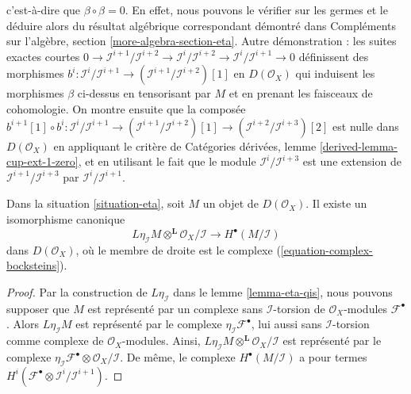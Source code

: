 {c'est-à-dire que $\beta \circ \beta = 0$. En effet, nous pouvons le vérifier sur les germes et le déduire alors du résultat algébrique correspondant démontré dans Compléments sur l'algèbre, section \ref{more-algebra-section-eta}. Autre démonstration : les suites exactes courtes
$0 \to \mathcal{I}^{i + 1}/\mathcal{I}^{i + 2}
\to \mathcal{I}^i/\mathcal{I}^{i + 2}
\to \mathcal{I}^i/\mathcal{I}^{i + 1} \to 0$
définissent des morphismes
$b^i : \mathcal{I}^i/\mathcal{I}^{i + 1} \to
(\mathcal{I}^{i + 1}/\mathcal{I}^{i + 2})[1]$
en $D(\mathcal{O}_X)$
qui induisent les morphismes $\beta$ ci-dessus en tensorisant par $M$
et en prenant les faisceaux de cohomologie. On montre ensuite que la composée
$b^{i + 1}[1] \circ b^i : \mathcal{I}^i/\mathcal{I}^{i + 1} \to
(\mathcal{I}^{i + 1}/\mathcal{I}^{i + 2})[1] \to
(\mathcal{I}^{i + 2}/\mathcal{I}^{i + 3})[2]$
est nulle dans $D(\mathcal{O}_X)$ en appliquant le critère de Catégories dérivées, lemme \ref{derived-lemma-cup-ext-1-zero},
et en utilisant le fait que le module $\mathcal{I}^i/\mathcal{I}^{i + 3}$
est une extension de $\mathcal{I}^{i + 1}/\mathcal{I}^{i + 3}$
par $\mathcal{I}^i/\mathcal{I}^{i + 1}$.

\begin{lemma}

\label{lemma-eta-second-property}

Dans la situation \ref{situation-eta}, soit $M$ un objet de
$D(\mathcal{O}_X)$. Il existe un isomorphisme canonique
$$
L\eta_\mathcal{I}M \otimes^\mathbf{L} \mathcal{O}_X/\mathcal{I}
\longrightarrow
H^\bullet(M/\mathcal{I})
$$
dans $D(\mathcal{O}_X)$, où le membre de droite est le complexe (\ref{equation-complex-bocksteins}).

\end{lemma}

\begin{proof}
Par la construction de $L\eta_\mathcal{I}$ dans le lemme \ref{lemma-eta-qis}, nous pouvons supposer que $M$ est représenté par un complexe sans $\mathcal{I}$-torsion de $\mathcal{O}_X$-modules $\mathcal{F}^\bullet$. Alors $L\eta_\mathcal{I}M$ est représenté par le complexe $\eta_\mathcal{I}\mathcal{F}^\bullet$, lui aussi sans $\mathcal{I}$-torsion comme complexe de $\mathcal{O}_X$-modules. Ainsi, $L\eta_\mathcal{I}M \otimes^\mathbf{L} \mathcal{O}_X/\mathcal{I}$ est représenté par le complexe $\eta_\mathcal{I}\mathcal{F}^\bullet \otimes \mathcal{O}_X/\mathcal{I}$. De même, le complexe $H^\bullet(M/\mathcal{I})$ a pour termes $H^i(\mathcal{F}^\bullet \otimes \mathcal{I}^i/\mathcal{I}^{i + 1})$.


\end{proof}}
